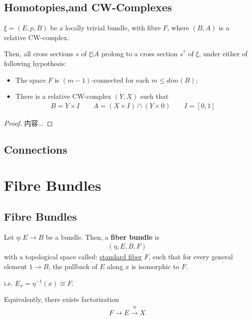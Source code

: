 \documentclass[Total.tex]{subfiles}
\begin{document}
	\section{Homotopies,and CW-Complexes}
		\begin{theorem}
			$\xi=(E,p,B)$ be a locally trivial bundle, with fibre $F$, where $(B,A)$ is a relative CW-complex.
			
			Then, all cross sections $s$ of $\xi|A$ prolong to a cross section $s^*$ of $\xi$, under either of following hypothesis:
			\begin{itemize}
				\item The space $F$ is $(m-1)$-connected for each $m\leq dim(B)$;
				\item There is a relative CW-complex $(Y,X)$ such that
				\begin{gather*}
					B=Y\times I\qquad A=(X\times I)\cap (Y\times 0)\qquad I=[0,1]
				\end{gather*}
			\end{itemize}
		\end{theorem}
		\begin{proof}
			内容...
		\end{proof}
	\section{Connections}
	
	\chapter{Fibre Bundles}
		\section{Fibre Bundles}
			\begin{Def}
				Let $\eta:E\rightarrow B$ be a bundle. Then, a \textbf{fiber bundle} is 
				\begin{gather*}
					(\eta,E,B,F)
				\end{gather*} with a topological space called: \underline{standard fiber} $F$, such that for every general element $1\rightarrow B$, the pullback of $E$ along $x$ is isomorphic to $F$.
				
				i.e. $E_x=\eta^{-1}(x)\cong F$.
			\end{Def}
			
			Equivalently, there exists factorization
			\begin{gather*}
				F\rightarrow E\stackrel{\eta}{\rightarrow} X
			\end{gather*}
			
\end{document}
